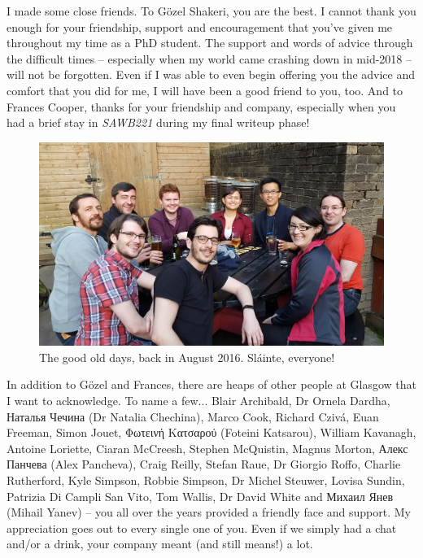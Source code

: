 \begin{preamble}
I made some close friends. To G\"{o}zel Shakeri, you are the best. I cannot thank you enough for your friendship, support and encouragement that you've given me throughout my time as a PhD student. The support and words of advice through the difficult times -- especially when my world came crashing down in mid-2018 -- will not be forgotten. Even if I was able to even begin offering you the advice and comfort that you did for me, I will have been a good friend to you, too. And to Frances Cooper, thanks for your friendship and company, especially when you had a brief stay in \emph{SAWB221} during my final writeup phase!

\renewcommand{\figurename}{Picture}
\begin{figure}
    \begin{center}
    \vspace*{-9mm}
    \includegraphics[width=1\textwidth]{figures/ch0-brel.jpg}
    \end{center}
    \vspace*{-6mm}
    \caption{The good old days, back in August 2016. Sl\'{a}inte, everyone!}
    \label{fig:acks_friends}
\end{figure}
\renewcommand{\figurename}{Figure}

In addition to G\"{o}zel and Frances, there are heaps of other people at Glasgow that I want to acknowledge. To name a few... Blair Archibald, Dr Ornela Dardha, Наталья Чечина (Dr Natalia Chechina), Marco Cook, Richard Cziv\'{a}, Euan Freeman, Simon Jouet, Φωτεινή Κατσαρού (Foteini Katsarou), William Kavanagh, Antoine Loriette, Ciaran McCreesh, Stephen McQuistin, Magnus Morton, Алекс Панчева (Alex Pancheva), Craig Reilly, Stefan Raue, Dr Giorgio Roffo, Charlie Rutherford, Kyle Simpson, Robbie Simpson, Dr Michel Steuwer, Lovisa Sundin, Patrizia Di Campli San Vito, Tom Wallis, Dr David White and Михаил Янев (Mihail Yanev) -- you all over the years provided a friendly face and support. My appreciation goes out to every single one of you. Even if we simply had a chat and/or a drink, your company meant (and still means!) a lot.


\end{preamble}
